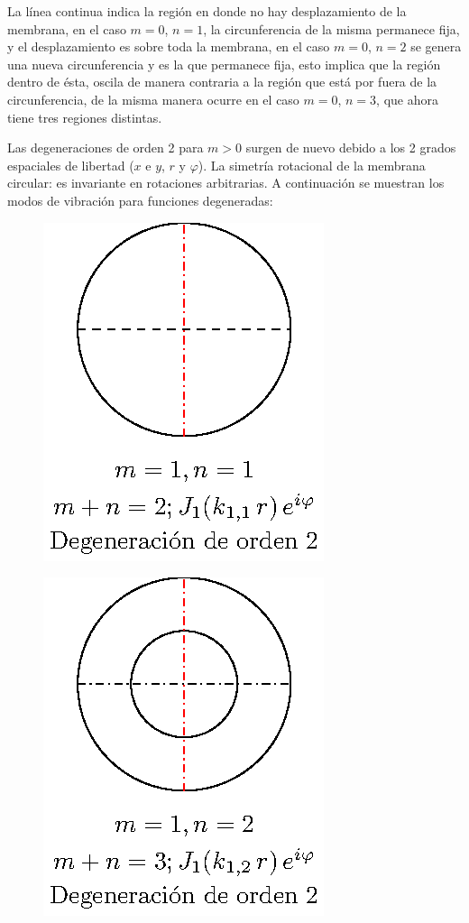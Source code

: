 La línea continua indica la región en donde no hay desplazamiento de la membrana, en el caso $m = 0$, $n = 1$, la circunferencia de la misma permanece fija, y el desplazamiento es sobre toda la membrana, en el caso $m = 0$, $n = 2$ se genera una nueva circunferencia y es la que permanece fija, esto implica que la región dentro de ésta, oscila de manera contraria a la región que está por fuera de la circunferencia, de la misma manera ocurre en el caso $m = 0$, $n = 3$, que ahora tiene tres regiones distintas.
\par
Las degeneraciones de orden 2 para $m > 0$ surgen de nuevo debido a los 2 grados espaciales de libertad ($x$ e $y$, $r$ y $\varphi$). La simetría rotacional de la membrana circular: es invariante en rotaciones arbitrarias. A continuación se muestran los modos de vibración para funciones degeneradas:
\begin{minipage}{0.3\linewidth}
\begin{figure}[H]
    \centering
    \includegraphics[scale=1]{Imagenes/Modos_Vibracion_Membrana_1_1.eps}
\end{figure}
\end{minipage}
\begin{minipage}{0.3\linewidth}
\begin{figure}[H]
    \centering
    \includegraphics[scale=1]{Imagenes/Modos_Vibracion_Membrana_1_2.eps}
\end{figure}
\end{minipage}
